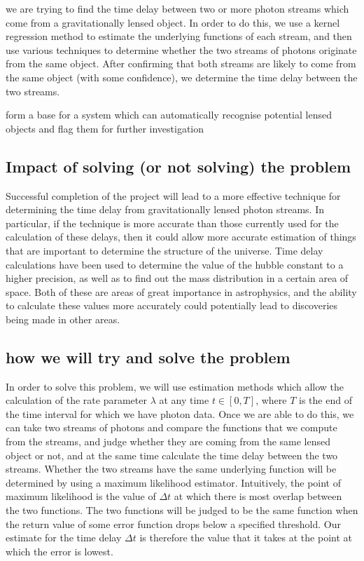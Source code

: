\documentclass[a4paper,11pt]{article}
\begin{document}
   we are trying to find the time delay between two or more photon
   streams which come from a gravitationally lensed object. In order
   to do this, we use a kernel regression method to estimate the
   underlying functions of each stream, and then use various
   techniques to determine whether the two streams of photons
   originate from the same object. After confirming that both streams
   are likely to come from the same object (with some confidence), we
   determine the time delay between the two streams.

form a base for a system which can automatically recognise potential
lensed objects and flag them for further investigation
\subsection{Impact of solving (or not solving) the problem}
\label{sec-1-2}

   Successful completion of the project will lead to a more effective
   technique for determining the time delay from gravitationally
   lensed photon streams. In particular, if the technique is more
   accurate than those currently used for the calculation of these
   delays, then it could allow more accurate estimation of things that
   are important to determine the structure of the universe. Time
   delay calculations have been used to determine the value of the
   hubble constant to a higher precision, as well as to find out the
   mass distribution in a certain area of space. Both of these are
   areas of great importance in astrophysics, and the ability to
   calculate these values more accurately could potentially lead to
   discoveries being made in other areas.
\subsection{how we will try and solve the problem}
\label{sec-1-3}

   In order to solve this problem, we will use estimation methods
   which allow the calculation of the rate parameter $\lambda$ at any
   time $t \in[0,T]$, where $T$ is the end of the time interval for
   which we have photon data. Once we are able to do this, we can take
   two streams of photons and compare the functions that we compute
   from the streams, and judge whether they are coming from the same
   lensed object or not, and at the same time calculate the time delay
   between the two streams. Whether the two streams have the same
   underlying function will be determined by using a maximum
   likelihood estimator. Intuitively, the point of maximum likelihood
   is the value of $\Delta t$ at which there is most overlap between
   the two functions. The two functions will be judged to be the same
   function when the return value of some error function drops below a
   specified threshold. Our estimate for the time delay $\Delta t$ is
   therefore the value that it takes at the point at which the error
   is lowest.
\end{document}
